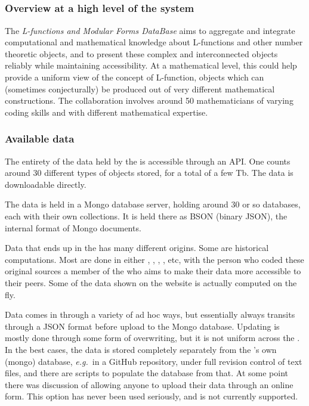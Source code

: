 \subsection{\GAP}

\subsection{\LMFDB}

\subsubsection{Overview at a high level of the \LMFDB system}

 The \emph{L-functions and Modular Forms DataBase} \cite{LMFDB} aims to aggregate and integrate computational and mathematical knowledge about L-functions and other number theoretic objects, and to present these complex and interconnected objects reliably while maintaining accessibility. At a mathematical level, this could help provide a uniform view of the concept of L-function, objects which can (sometimes conjecturally) be produced out of very different mathematical constructions. The collaboration involves around 50 mathematicians of varying coding skills and with different mathematical expertise.

\subsubsection{Available data}

The entirety of the data held by the \LMFDB is accessible through an API. One counts around 30 different types of objects stored, for a total of a few Tb. The data is downloadable directly.

The data is held in a Mongo database server, holding around 30 or so databases, each with their own collections. It is held there as BSON (binary JSON), the internal format of Mongo documents.

Data that ends up in the \LMFDB has many different origins. Some are historical computations. Most are done in either \GAP, \Pari, \SageMath, \Magma, etc, with the person who coded these original sources a member of the \LMFDB who aims to make their data more accessible to their peers. Some of the data shown on the website is actually computed on the fly.

Data comes in through a variety of ad hoc ways, but essentially always transits through a JSON format before upload to the Mongo database. Updating is mostly done through some form of overwriting, but it is not uniform across the \LMFDB. In the best cases, the data is stored completely separately from the \LMFDB's own (mongo) database, \emph{e.g.}~in a GitHub repository, under full revision control of text files, and there are scripts to populate the database from that.
 At some point there was discussion of allowing anyone to upload their data through an online form. This option has never been used seriously, and is not currently supported.


